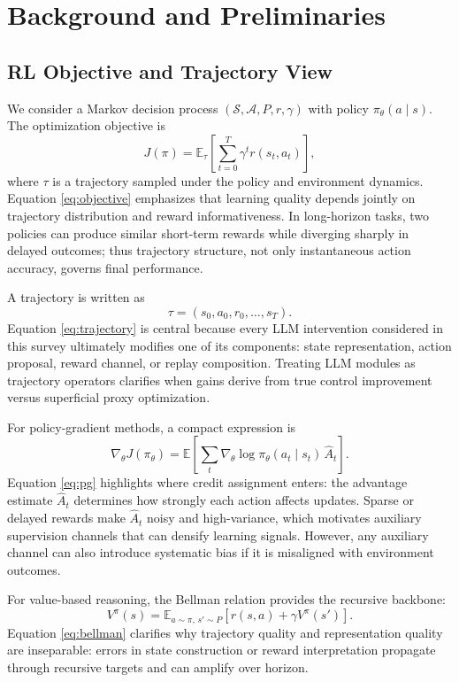 \documentclass[pdflatex,sn-mathphys-num]{sn-jnl}
\begin{document}
\section{Background and Preliminaries}
\subsection{RL Objective and Trajectory View}
We consider a Markov decision process $(\mathcal{S},\mathcal{A},P,r,\gamma)$ with policy $\pi_\theta(a\mid s)$. The optimization objective is
\begin{equation}
J(\pi)=\mathbb{E}_{\tau}\left[\sum_{t=0}^{T}\gamma^t r(s_t,a_t)\right],
\label{eq:objective}
\end{equation}
where $\tau$ is a trajectory sampled under the policy and environment dynamics. Equation \eqref{eq:objective} emphasizes that learning quality depends jointly on trajectory distribution and reward informativeness. In long-horizon tasks, two policies can produce similar short-term rewards while diverging sharply in delayed outcomes; thus trajectory structure, not only instantaneous action accuracy, governs final performance.

A trajectory is written as
\begin{equation}
\tau=(s_0,a_0,r_0,\ldots,s_T).
\label{eq:trajectory}
\end{equation}
Equation \eqref{eq:trajectory} is central because every LLM intervention considered in this survey ultimately modifies one of its components: state representation, action proposal, reward channel, or replay composition. Treating LLM modules as trajectory operators clarifies when gains derive from true control improvement versus superficial proxy optimization.

For policy-gradient methods, a compact expression is
\begin{equation}
\nabla_{\theta}J(\pi_\theta)=\mathbb{E}\left[\sum_t \nabla_{\theta}\log\pi_\theta(a_t\mid s_t)\,\hat{A}_t\right].
\label{eq:pg}
\end{equation}
Equation \eqref{eq:pg} highlights where credit assignment enters: the advantage estimate $\hat{A}_t$ determines how strongly each action affects updates. Sparse or delayed rewards make $\hat{A}_t$ noisy and high-variance, which motivates auxiliary supervision channels that can densify learning signals. However, any auxiliary channel can also introduce systematic bias if it is misaligned with environment outcomes.

For value-based reasoning, the Bellman relation provides the recursive backbone:
\begin{equation}
V^{\pi}(s)=\mathbb{E}_{a\sim\pi,\,s'\sim P}\left[r(s,a)+\gamma V^{\pi}(s')\right].
\label{eq:bellman}
\end{equation}
Equation \eqref{eq:bellman} clarifies why trajectory quality and representation quality are inseparable: errors in state construction or reward interpretation propagate through recursive targets and can amplify over horizon.
\end{document}

